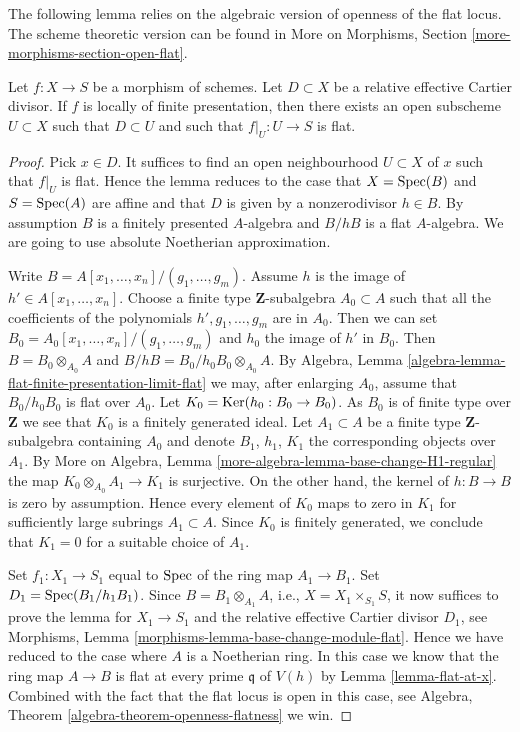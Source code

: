 \noindent
The following lemma relies on the algebraic version of
openness of the flat locus. The scheme theoretic version can be found in
More on Morphisms, Section \ref{more-morphisms-section-open-flat}.

\begin{lemma}
\label{lemma-flat-relative-Cartier-divisor}
Let $f : X \to S$ be a morphism of schemes.
Let $D \subset X$ be a relative effective Cartier divisor.
If $f$ is locally of finite presentation, then there exists
an open subscheme $U \subset X$ such that $D \subset U$ and
such that $f|_U : U \to S$ is flat.
\end{lemma}

\begin{proof}
Pick $x \in D$. It suffices to find an open neighbourhood $U \subset X$
of $x$ such that $f|_U$ is flat. Hence the lemma reduces to the case
that $X = \mathop{\mathrm{Spec}}(B)$ and $S = \mathop{\mathrm{Spec}}(A)$ are affine
and that $D$ is given by a nonzerodivisor $h \in B$. By assumption
$B$ is a finitely presented $A$-algebra and $B/hB$ is a flat
$A$-algebra. We are going to use absolute Noetherian approximation.

\medskip\noindent
Write $B = A[x_1, \ldots, x_n]/(g_1, \ldots, g_m)$. Assume
$h$ is the image of $h' \in A[x_1, \ldots, x_n]$. Choose a finite type
$\mathbf{Z}$-subalgebra $A_0 \subset A$ such that all the coefficients
of the polynomials $h', g_1, \ldots, g_m$ are in $A_0$. Then we can set
$B_0 = A_0[x_1, \ldots, x_n]/(g_1, \ldots, g_m)$ and $h_0$ the image
of $h'$ in $B_0$. Then $B = B_0 \otimes_{A_0} A$ and
$B/hB = B_0/h_0B_0 \otimes_{A_0} A$. By Algebra, Lemma
\ref{algebra-lemma-flat-finite-presentation-limit-flat}
we may, after enlarging $A_0$, assume that $B_0/h_0B_0$ is flat
over $A_0$. Let $K_0 = \mathop{\mathrm{Ker}}(h_0 : B_0 \to B_0)$.
As $B_0$ is of finite type over $\mathbf{Z}$ we see that $K_0$ is
a finitely generated ideal. Let $A_1 \subset A$ be a finite type
$\mathbf{Z}$-subalgebra containing $A_0$ and denote $B_1$, $h_1$, $K_1$
the corresponding objects over $A_1$. By
More on Algebra, Lemma \ref{more-algebra-lemma-base-change-H1-regular}
the map $K_0 \otimes_{A_0} A_1 \to K_1$ is surjective. On the other hand,
the kernel of $h : B \to B$ is zero by assumption. Hence every element
of $K_0$ maps to zero in $K_1$ for sufficiently large subrings
$A_1 \subset A$. Since $K_0$ is finitely generated, we conclude that
$K_1 = 0$ for a suitable choice of $A_1$.

\medskip\noindent
Set $f_1 : X_1 \to S_1$ equal to $\mathop{\mathrm{Spec}}$ of the
ring map $A_1 \to B_1$. Set $D_1 = \mathop{\mathrm{Spec}}(B_1/h_1B_1)$.
Since $B = B_1 \otimes_{A_1} A$, i.e., $X = X_1 \times_{S_1} S$,
it now suffices to prove the lemma for $X_1 \to S_1$ and the relative
effective Cartier divisor $D_1$, see
Morphisms, Lemma \ref{morphisms-lemma-base-change-module-flat}.
Hence we have reduced to the case where $A$ is a Noetherian ring.
In this case we know that the ring map $A \to B$ is flat at every
prime $\mathfrak q$ of $V(h)$ by
Lemma \ref{lemma-flat-at-x}.
Combined with the fact that the flat locus is open in this case, see
Algebra, Theorem \ref{algebra-theorem-openness-flatness}
we win.
\end{proof}

